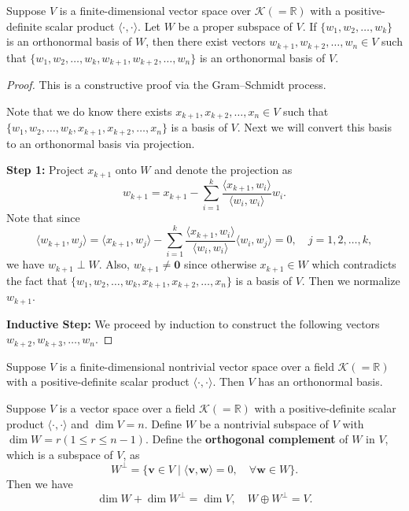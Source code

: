 \documentclass{ctexart}
\begin{document}
	\begin{mylma}
		Suppose $V$ is a finite-dimensional vector space over $\mathcal{K}\left( = \mathbb{R} \right)$ with a positive-definite scalar product $\langle \cdot, \cdot \rangle$. Let $W$ be a proper subspace of $V$. If $\{w_1, w_2, \ldots, w_k\}$ is an orthonormal basis of $W$, then there exist vectors $w_{k+1}, w_{k+2}, \ldots, w_n \in V$ such that $\{w_1, w_2, \ldots, w_k, w_{k+1}, w_{k+2}, \ldots, w_n\}$ is an orthonormal basis of $V$.
	\end{mylma}
	\begin{proof}
		This is a constructive proof via the Gram–Schmidt process. 

		Note that we do know there exists $x_{k+1}, x_{k+2}, \ldots, x_n \in V$ such that $\{w_1, w_2, \ldots, w_k, x_{k+1}, x_{k+2}, \ldots, x_n\}$ is a basis of $V$. Next we will convert this basis to an orthonormal basis via projection.

		\textbf{Step 1:} Project $x_{k+1}$ onto $W$ and denote the projection as
		\[
		w_{k+1} = x_{k+1} - \sum_{i=1}^k \frac{\langle x_{k+1}, w_i \rangle}{\langle w_i, w_i \rangle} w_i.
		\]
		Note that since
		\[
		\langle w_{k+1}, w_j \rangle = \langle x_{k+1}, w_j \rangle - \sum_{i=1}^k \frac{\langle x_{k+1}, w_i \rangle}{\langle w_i, w_i \rangle} \langle w_i, w_j \rangle = 0, \quad j=1,2,\ldots,k,
		\]
		we have $w_{k+1} \perp W$. Also, $w_{k+1} \neq \mathbf{0}$ since otherwise $x_{k+1} \in W$ which contradicts the fact that $\{w_1, w_2, \ldots, w_k, x_{k+1}, x_{k+2}, \ldots, x_n\}$ is a basis of $V$. Then we normalize $w_{k+1}$.

		\textbf{Inductive Step:} We proceed by induction to construct the following vectors $w_{k+2}, w_{k+3}, \ldots, w_n$.

	\end{proof}
	\begin{mythm}
		Suppose $V$ is a finite-dimensional nontrivial vector space over a field $\mathcal{K}\left( = \mathbb{R} \right)$ with a positive-definite scalar product $\langle \cdot, \cdot \rangle$. Then $V$ has an orthonormal basis.
	\end{mythm}
	\begin{mythm}
		Suppose $V$ is a vector space over a field $\mathcal{K}\left( = \mathbb{R} \right)$ with a positive-definite scalar product $\langle \cdot, \cdot \rangle$ and $\dim V = n$. Define $W$ be a nontrivial subspace of $V$ with $\dim W = r \left( 1\le r \le n-1 \right) $. Define the \textbf{orthogonal complement} of $W$ in $V$, which is a subspace of $V$, as
		\[
		W^\perp = \{ \mathbf{v} \in V \mid \langle \mathbf{v}, \mathbf{w} \rangle = 0, \quad \forall \mathbf{w} \in W \}.
		\]
		Then we have
		\[
		\dim W + \dim W^\perp = \dim V, \quad W \oplus W^\perp = V.
		\]
	\end{mythm}
\end{document}
